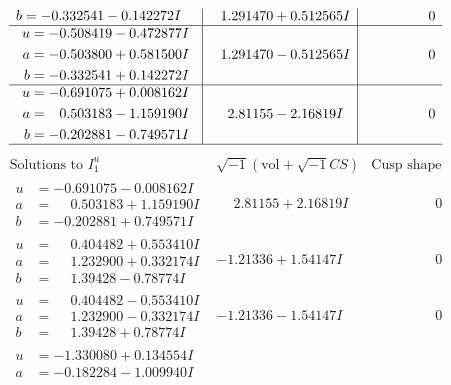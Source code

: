 \documentclass[1p]{elsarticle_modified}
\theoremstyle{definition}
\newcommand{\I}{\sqrt{-1}}
\begin{document}
$$\begin{array}{c|c|c}
\begin{aligned}
b &= -0.332541 - 0.142272 I\end{aligned}
 & \phantom{-}1.291470 + 0.512565 I & \phantom{-0.000000 } 0 \\ \hline\begin{aligned}
u &= -0.508419 - 0.472877 I \\
a &= -0.503800 + 0.581500 I \\
b &= -0.332541 + 0.142272 I\end{aligned}
 & \phantom{-}1.291470 - 0.512565 I & \phantom{-0.000000 } 0 \\ \hline\begin{aligned}
u &= -0.691075 + 0.008162 I \\
a &= \phantom{-}0.503183 - 1.159190 I \\
b &= -0.202881 - 0.749571 I\end{aligned}
 & \phantom{-}2.81155 - 2.16819 I & \phantom{-0.000000 } 0\\
 \hline 
 \end{array}$$\newpage$$\begin{array}{c|c|c}  
\text{Solutions to }I^u_{1}& \I (\text{vol} + \sqrt{-1}CS) & \text{Cusp shape}\\
 \hline 
\begin{aligned}
u &= -0.691075 - 0.008162 I \\
a &= \phantom{-}0.503183 + 1.159190 I \\
b &= -0.202881 + 0.749571 I\end{aligned}
 & \phantom{-}2.81155 + 2.16819 I & \phantom{-0.000000 } 0 \\ \hline\begin{aligned}
u &= \phantom{-}0.404482 + 0.553410 I \\
a &= \phantom{-}1.232900 + 0.332174 I \\
b &= \phantom{-}1.39428 - 0.78774 I\end{aligned}
 & -1.21336 + 1.54147 I & \phantom{-0.000000 } 0 \\ \hline\begin{aligned}
u &= \phantom{-}0.404482 - 0.553410 I \\
a &= \phantom{-}1.232900 - 0.332174 I \\
b &= \phantom{-}1.39428 + 0.78774 I\end{aligned}
 & -1.21336 - 1.54147 I & \phantom{-0.000000 } 0 \\ \hline\begin{aligned}
u &= -1.330080 + 0.134554 I \\
a &= -0.182284 - 1.009940 I \\

\end{aligned}
\end{array}$$
\end{document}
